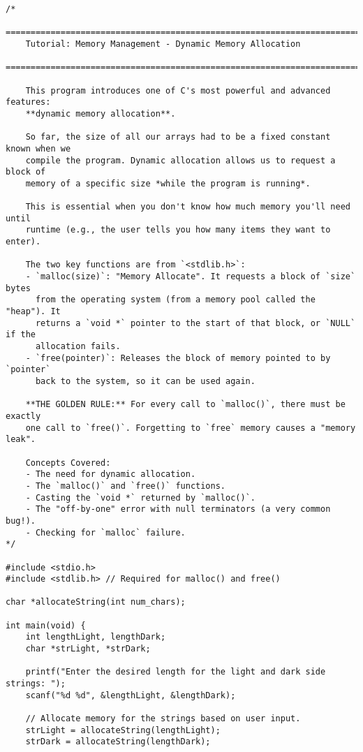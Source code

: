 \documentclass[11pt]{book}
\begin{document}
\begin{verbatim}
/*
    ================================================================================
    Tutorial: Memory Management - Dynamic Memory Allocation
    ================================================================================

    This program introduces one of C's most powerful and advanced features:
    **dynamic memory allocation**.

    So far, the size of all our arrays had to be a fixed constant known when we
    compile the program. Dynamic allocation allows us to request a block of
    memory of a specific size *while the program is running*.

    This is essential when you don't know how much memory you'll need until
    runtime (e.g., the user tells you how many items they want to enter).

    The two key functions are from `<stdlib.h>`:
    - `malloc(size)`: "Memory Allocate". It requests a block of `size` bytes
      from the operating system (from a memory pool called the "heap"). It
      returns a `void *` pointer to the start of that block, or `NULL` if the
      allocation fails.
    - `free(pointer)`: Releases the block of memory pointed to by `pointer`
      back to the system, so it can be used again.

    **THE GOLDEN RULE:** For every call to `malloc()`, there must be exactly
    one call to `free()`. Forgetting to `free` memory causes a "memory leak".

    Concepts Covered:
    - The need for dynamic allocation.
    - The `malloc()` and `free()` functions.
    - Casting the `void *` returned by `malloc()`.
    - The "off-by-one" error with null terminators (a very common bug!).
    - Checking for `malloc` failure.
*/

#include <stdio.h>
#include <stdlib.h> // Required for malloc() and free()

char *allocateString(int num_chars);

int main(void) {
    int lengthLight, lengthDark;
    char *strLight, *strDark;

    printf("Enter the desired length for the light and dark side strings: ");
    scanf("%d %d", &lengthLight, &lengthDark);

    // Allocate memory for the strings based on user input.
    strLight = allocateString(lengthLight);
    strDark = allocateString(lengthDark);


\end{verbatim}
\end{document}
